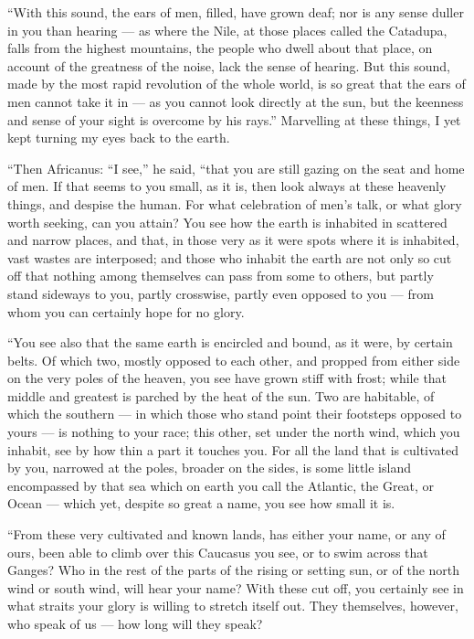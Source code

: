  ``With this sound, the ears of men, filled, have grown deaf; nor is any sense duller in you than hearing --- as where the Nile, at those places called the Catadupa, falls from the highest mountains, the people who dwell about that place, on account of the greatness of the noise, lack the sense of hearing. But this sound, made by the most rapid revolution of the whole world, is so great that the ears of men cannot take it in --- as you cannot look directly at the sun, but the keenness and sense of your sight is overcome by his rays.'' Marvelling at these things, I yet kept turning my eyes back to the earth.

 ``Then Africanus: ``I see,'' he said, ``that you are still gazing on the seat and home of men. If that seems to you small, as it is, then look always at these heavenly things, and despise the human. For what celebration of men's talk, or what glory worth seeking, can you attain? You see how the earth is inhabited in scattered and narrow places, and that, in those very as it were spots where it is inhabited, vast wastes are interposed; and those who inhabit the earth are not only so cut off that nothing among themselves can pass from some to others, but partly stand sideways to you, partly crosswise, partly even opposed to you --- from whom you can certainly hope for no glory.

 ``You see also that the same earth is encircled and bound, as it were, by certain belts. Of which two, mostly opposed to each other, and propped from either side on the very poles of the heaven, you see have grown stiff with frost; while that middle and greatest is parched by the heat of the sun. Two are habitable, of which the southern --- in which those who stand point their footsteps opposed to yours --- is nothing to your race; this other, set under the north wind, which you inhabit, see by how thin a part it touches you. For all the land that is cultivated by you, narrowed at the poles, broader on the sides, is some little island encompassed by that sea which on earth you call the Atlantic, the Great, or Ocean --- which yet, despite so great a name, you see how small it is.

 ``From these very cultivated and known lands, has either your name, or any of ours, been able to climb over this Caucasus you see, or to swim across that Ganges? Who in the rest of the parts of the rising or setting sun, or of the north wind or south wind, will hear your name? With these cut off, you certainly see in what straits your glory is willing to stretch itself out. They themselves, however, who speak of us --- how long will they speak?

